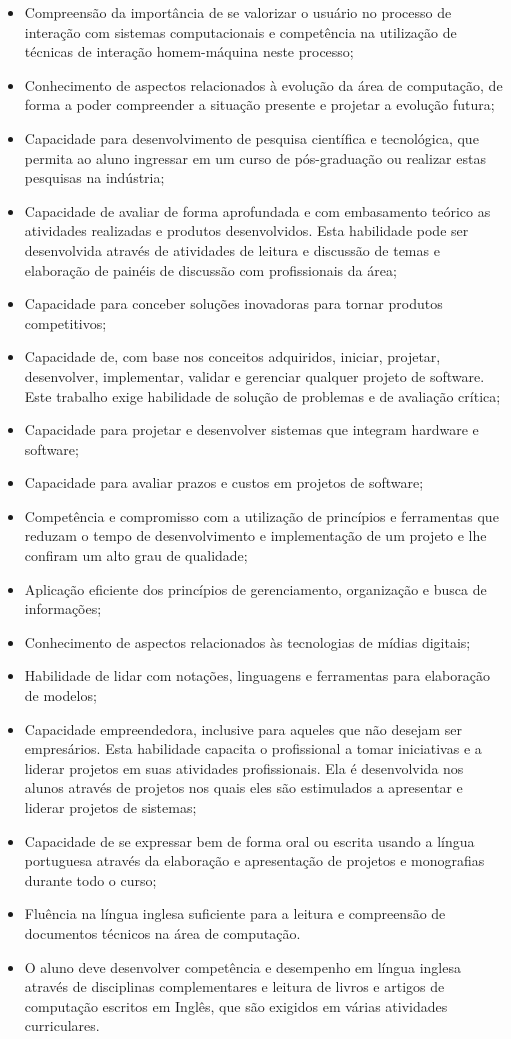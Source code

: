 \begin{itemize}
    \item Compreensão da importância de se valorizar o  usuário  no  processo  de  interação com sistemas computacionais e competência na utilização de técnicas de interação homem-máquina neste processo;
    \item Conhecimento de aspectos relacionados à evolução da área de computação, de forma a poder compreender a situação presente e projetar a evolução futura;
    \item Capacidade para desenvolvimento de pesquisa científica e tecnológica, que permita ao aluno ingressar em um curso de pós-graduação ou realizar estas pesquisas na indústria;
    \item Capacidade de avaliar de forma aprofundada e com embasamento teórico as atividades realizadas e produtos desenvolvidos. Esta habilidade pode ser desenvolvida através de atividades de leitura e discussão de temas e elaboração de painéis de discussão com profissionais da área;
    \item Capacidade para conceber soluções inovadoras para tornar produtos competitivos;
    \item Capacidade de, com base nos conceitos adquiridos, iniciar, projetar, desenvolver, implementar, validar e gerenciar qualquer projeto de software. Este trabalho exige habilidade de solução de problemas e de avaliação crítica;
    \item Capacidade para projetar e desenvolver sistemas que integram hardware e software;
    \item Capacidade para avaliar prazos e custos em projetos de software;
    \item Competência e compromisso com a utilização de princípios e ferramentas que reduzam o tempo de desenvolvimento e implementação de um projeto e lhe confiram um alto grau de qualidade;
    \item Aplicação eficiente dos princípios de gerenciamento, organização e busca de informações;
    \item Conhecimento de aspectos relacionados às tecnologias de mídias digitais;
    \item Habilidade de lidar com notações, linguagens e ferramentas para elaboração de modelos;
    \item Capacidade empreendedora, inclusive para aqueles que não desejam ser empresários. Esta habilidade capacita o profissional a tomar iniciativas e a liderar projetos em suas atividades profissionais. Ela é desenvolvida nos alunos através de projetos nos quais eles são estimulados a apresentar e liderar projetos de sistemas;
    \item Capacidade de se expressar bem de forma oral ou escrita usando a língua portuguesa através da elaboração e apresentação de projetos e monografias durante todo o curso;
    \item Fluência na língua inglesa suficiente para a leitura e compreensão de documentos técnicos na área de computação.
    \item O aluno deve desenvolver competência e desempenho em língua inglesa através de disciplinas complementares e leitura de livros e artigos de computação escritos em Inglês, que são exigidos em várias atividades curriculares. 
\end{itemize}